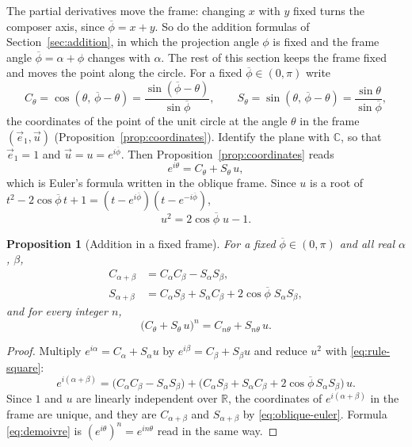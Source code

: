 \documentclass[11pt]{amsart}
\newtheorem{prop}[thm]{Proposition}
\theoremstyle{definition}
\theoremstyle{remark}
\numberwithin{equation}{section}
\newcommand{\pb}{\overline{\phi}}
\begin{document}
The partial derivatives move the frame: changing $x$ with $y$ fixed
turns the composer axis, since $\pb = x+y$. So do the addition formulas of
Section~\ref{sec:addition}, in which the projection angle $\phi$ is fixed
and the frame angle $\pb = \alpha + \phi$ changes with $\alpha$. The rest of
this section keeps the frame fixed and moves the point along the circle.
For a fixed $\pb \in (0,\pi)$ write
\begin{equation}
\label{eq:CS}
C_\theta = \cos(\theta,\,\pb-\theta) = \frac{\sin(\pb-\theta)}{\sin\pb}, \qquad
S_\theta = \sin(\theta,\,\pb-\theta) = \frac{\sin\theta}{\sin\pb},
\end{equation}
the coordinates of the point of the unit circle at the angle $\theta$ in
the frame $(\vec e_1,\vec u)$ (Proposition~\ref{prop:coordinates}).
Identify the plane with $\mathbb{C}$, so that $\vec e_1 = 1$ and
$\vec u = u = e^{i\pb}$. Then Proposition~\ref{prop:coordinates} reads
\begin{equation}
\label{eq:oblique-euler}
e^{i\theta} = C_\theta + S_\theta\, u ,
\end{equation}
which is Euler's formula written in the oblique frame. Since $u$ is a root
of $t^2 - 2\cos\pb\,t + 1 = (t - e^{i\pb})(t - e^{-i\pb})$,
\begin{equation}
\label{eq:rule-square}
u^2 = 2\cos\pb\; u - 1 .
\end{equation}

\begin{prop}[Addition in a fixed frame]
\label{prop:fixed-frame}
For a fixed $\pb \in (0,\pi)$ and all real $\alpha$, $\beta$,
\begin{align}
\label{eq:ff-cos}
C_{\alpha+\beta} &= C_\alpha C_\beta - S_\alpha S_\beta , \\
\label{eq:ff-sin}
S_{\alpha+\beta} &= C_\alpha S_\beta + S_\alpha C_\beta + 2\cos\pb\; S_\alpha S_\beta ,
\end{align}
and for every integer $n$,
\begin{equation}
\label{eq:demoivre}
\bigl(C_\theta + S_\theta\,u\bigr)^n = C_{n\theta} + S_{n\theta}\,u .
\end{equation}
\end{prop}

\begin{proof}
Multiply $e^{i\alpha} = C_\alpha + S_\alpha u$ by $e^{i\beta} = C_\beta + S_\beta u$
and reduce $u^2$ with \eqref{eq:rule-square}:
\[
e^{i(\alpha+\beta)} = \bigl(C_\alpha C_\beta - S_\alpha S_\beta\bigr)
+ \bigl(C_\alpha S_\beta + S_\alpha C_\beta + 2\cos\pb\,S_\alpha S_\beta\bigr)\,u .
\]
Since $1$ and $u$ are linearly independent over $\mathbb{R}$, the coordinates
of $e^{i(\alpha+\beta)}$ in the frame are unique, and they are
$C_{\alpha+\beta}$ and $S_{\alpha+\beta}$ by \eqref{eq:oblique-euler}. Formula
\eqref{eq:demoivre} is $(e^{i\theta})^n = e^{in\theta}$ read in the same way.
\end{proof}
\end{document}
